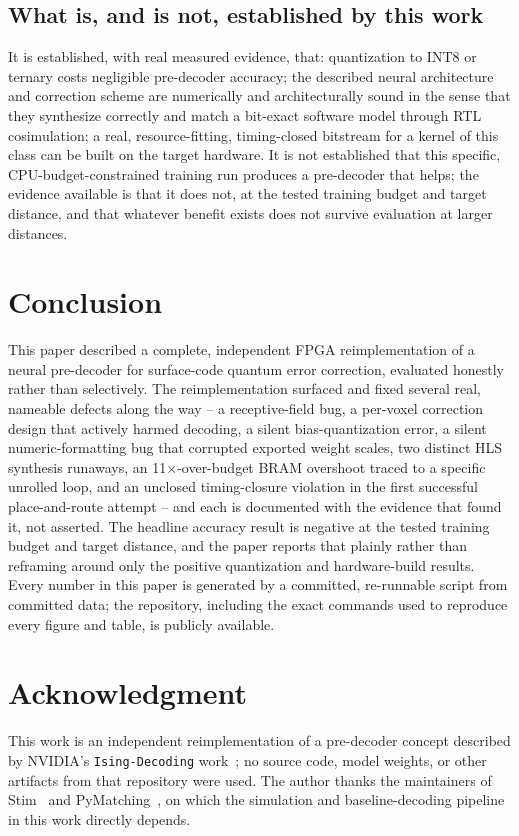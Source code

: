 \documentclass[conference]{IEEEtran}
\begin{document}
\subsection{What is, and is not, established by this work}
It is established, with real measured evidence, that: quantization to INT8 or ternary costs negligible pre-decoder accuracy; the described neural architecture and correction scheme are numerically and architecturally sound in the sense that they synthesize correctly and match a bit-exact software model through RTL cosimulation; a real, resource-fitting, timing-closed bitstream for a kernel of this class can be built on the target hardware. It is not established that this specific, CPU-budget-constrained training run produces a pre-decoder that helps; the evidence available is that it does not, at the tested training budget and target distance, and that whatever benefit exists does not survive evaluation at larger distances.

\section{Conclusion}
\label{sec:conclusion}

This paper described a complete, independent FPGA reimplementation of a neural pre-decoder for surface-code quantum error correction, evaluated honestly rather than selectively. The reimplementation surfaced and fixed several real, nameable defects along the way -- a receptive-field bug, a per-voxel correction design that actively harmed decoding, a silent bias-quantization error, a silent numeric-formatting bug that corrupted exported weight scales, two distinct HLS synthesis runaways, an 11\(\times\)-over-budget BRAM overshoot traced to a specific unrolled loop, and an unclosed timing-closure violation in the first successful place-and-route attempt -- and each is documented with the evidence that found it, not asserted. The headline accuracy result is negative at the tested training budget and target distance, and the paper reports that plainly rather than reframing around only the positive quantization and hardware-build results. Every number in this paper is generated by a committed, re-runnable script from committed data; the repository, including the exact commands used to reproduce every figure and table, is publicly available.

\section*{Acknowledgment}
This work is an independent reimplementation of a pre-decoder concept described by NVIDIA's \texttt{Ising-Decoding} work~\cite{chamberland2026fast}; no source code, model weights, or other artifacts from that repository were used. The author thanks the maintainers of Stim~\cite{gidney2021stim} and PyMatching~\cite{higgott2022pymatching}, on which the simulation and baseline-decoding pipeline in this work directly depends.
\end{document}
